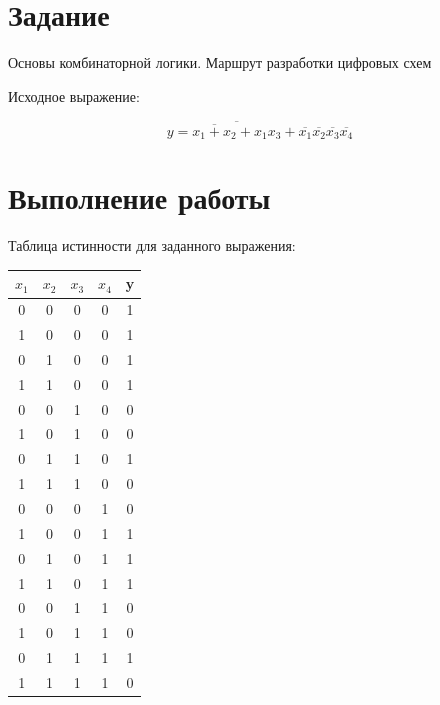\documentclass[a4paper,14pt]{article}
\begin{document}

\tableofcontents
\pagebreak
\section{Задание}

Основы комбинаторной логики. Маршрут разработки цифровых схем

Исходное выражение:

\begin{equation}
\label{eq:task}
y = \overline{\overline{x_1 + x_2} + x_1 x_3} + \overline{x_1}\overline{x_2}\overline{x_3}\overline{x_4}
\end{equation}

\section{Выполнение работы}

Таблица истинности для заданного выражения: 

\begin{table}[H]
	\begin{center}
		\begin{flushleft}
		\end{flushleft}
	
		\label{tab:logic}
		\begin{tabular}{|c|c|c|c|c|}
			\hline
			$x_1$ & $x_2$ & $x_3$ & $x_4$ & y \\ \hline
			0     & 0     & 0     & 0     & 1 \\ \hline
			1     & 0     & 0     & 0     & 1 \\ \hline
			0     & 1     & 0     & 0     & 1 \\ \hline
			1     & 1     & 0     & 0     & 1 \\ \hline
			0     & 0     & 1     & 0     & 0 \\ \hline
			1     & 0     & 1     & 0     & 0 \\ \hline
			0     & 1     & 1     & 0     & 1 \\ \hline
			1     & 1     & 1     & 0     & 0 \\ \hline
			0     & 0     & 0     & 1     & 0 \\ \hline
			1     & 0     & 0     & 1     & 1 \\ \hline
			0     & 1     & 0     & 1     & 1 \\ \hline
			1     & 1     & 0     & 1     & 1 \\ \hline
			0     & 0     & 1     & 1     & 0 \\ \hline
			1     & 0     & 1     & 1     & 0 \\ \hline
			0     & 1     & 1     & 1     & 1 \\ \hline
			1     & 1     & 1     & 1     & 0 \\ \hline
		\end{tabular}
	\end{center}
\end{table}
\end{document}
